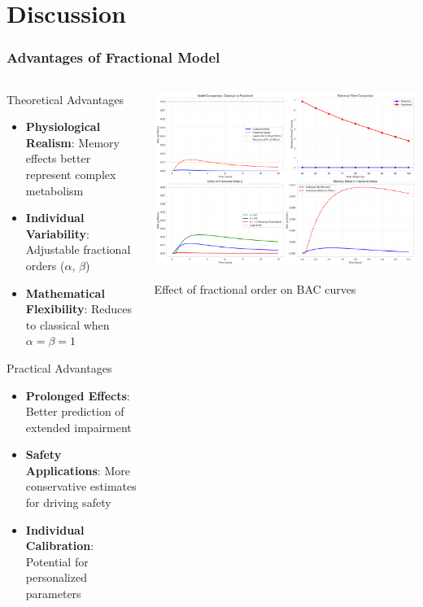 \documentclass{beamer}
\begin{document}
\section{Discussion}

\begin{frame}
\frametitle{Advantages of Fractional Model}
\begin{columns}
\begin{column}{0.5\textwidth}
\begin{block}{Theoretical Advantages}
\begin{itemize}
    \item \textbf{Physiological Realism}: Memory effects better represent complex metabolism
    \item \textbf{Individual Variability}: Adjustable fractional orders ($\alpha$, $\beta$)
    \item \textbf{Mathematical Flexibility}: Reduces to classical when $\alpha = \beta = 1$
\end{itemize}
\end{block}

\begin{block}{Practical Advantages}
\begin{itemize}
    \item \textbf{Prolonged Effects}: Better prediction of extended impairment
    \item \textbf{Safety Applications}: More conservative estimates for driving safety
    \item \textbf{Individual Calibration}: Potential for personalized parameters
\end{itemize}
\end{block}
\end{column}

\begin{column}{0.5\textwidth}
\begin{center}
\includegraphics[width=\textwidth]{model_analysis.png}
\caption*{Effect of fractional order on BAC curves}
\end{center}
\end{column}
\end{columns}
\end{frame}
\end{document}
